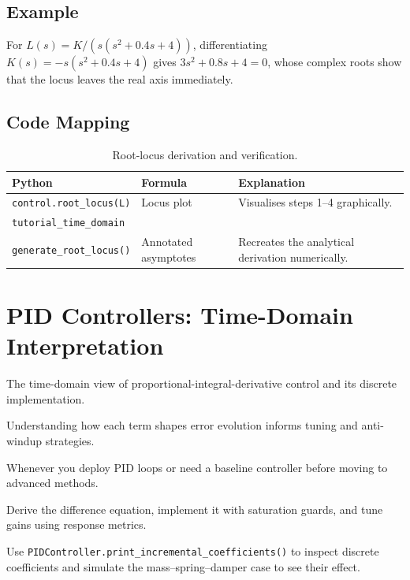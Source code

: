 \subsection{Example}
For $L(s) = K/(s(s^2 + 0.4 s + 4))$, differentiating $K(s) = -s(s^2 + 0.4s + 4)$ gives $3s^2 + 0.8 s + 4 = 0$, whose complex roots show that the locus leaves the real axis immediately.

\subsection{Code Mapping}
\begin{table}[h]
    \centering
    \small
    \renewcommand{\arraystretch}{1.2}
    \begin{tabularx}{\linewidth}{|>{\raggedright\arraybackslash}p{4cm}|X|X|}
        \hline
        \textbf{Python} & \textbf{Formula} & \textbf{Explanation} \\
        \hline
        \texttt{control.root\_locus(L)} & Locus plot & Visualises steps 1--4 graphically. \\
        \hline
        \texttt{tutorial\_time\_domain}\\\texttt{generate\_root\_locus()} & Annotated asymptotes & Recreates the analytical derivation numerically. \\
        \hline
    \end{tabularx}
    \caption{Root-locus derivation and verification.}
\end{table}

\section{PID Controllers: Time-Domain Interpretation}
\begin{beginnerguide}
    \item[\textbf{What?}] The time-domain view of proportional-integral-derivative control and its discrete implementation.
    \item[\textbf{Why?}] Understanding how each term shapes error evolution informs tuning and anti-windup strategies.
    \item[\textbf{When?}] Whenever you deploy PID loops or need a baseline controller before moving to advanced methods.
    \item[\textbf{How?}] Derive the difference equation, implement it with saturation guards, and tune gains using response metrics.
    \item[\textbf{Example}] Use \texttt{PIDController.print\_incremental\_coefficients()} to inspect discrete coefficients and simulate the mass--spring--damper case to see their effect.
\end{beginnerguide}
